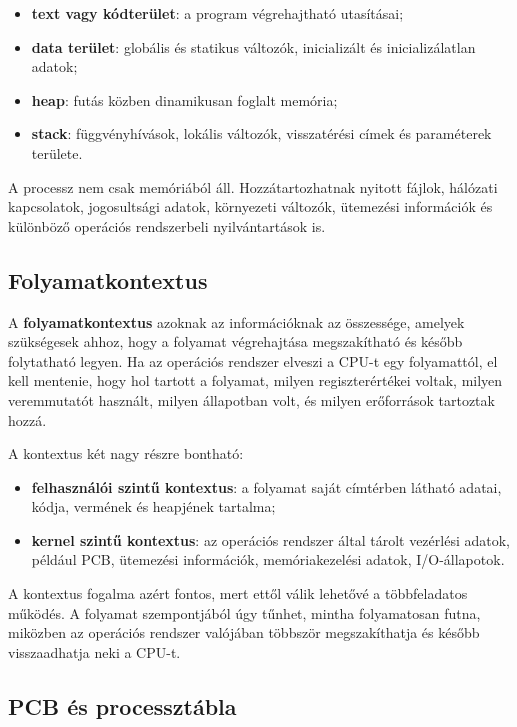 \begin{itemize}
  \item \textbf{text vagy kódterület}: a program végrehajtható utasításai;
  \item \textbf{data terület}: globális és statikus változók, inicializált és inicializálatlan adatok;
  \item \textbf{heap}: futás közben dinamikusan foglalt memória;
  \item \textbf{stack}: függvényhívások, lokális változók, visszatérési címek és paraméterek területe.
\end{itemize}

A processz nem csak memóriából áll. Hozzátartozhatnak nyitott fájlok, hálózati kapcsolatok, jogosultsági adatok, környezeti változók, ütemezési információk és különböző operációs rendszerbeli nyilvántartások is.

\subsection{Folyamatkontextus}

A \textbf{folyamatkontextus} azoknak az információknak az összessége, amelyek szükségesek ahhoz, hogy a folyamat végrehajtása megszakítható és később folytatható legyen. Ha az operációs rendszer elveszi a CPU-t egy folyamattól, el kell mentenie, hogy hol tartott a folyamat, milyen regiszterértékei voltak, milyen veremmutatót használt, milyen állapotban volt, és milyen erőforrások tartoztak hozzá.

A kontextus két nagy részre bontható:

\begin{itemize}
  \item \textbf{felhasználói szintű kontextus}: a folyamat saját címtérben látható adatai, kódja, vermének és heapjének tartalma;
  \item \textbf{kernel szintű kontextus}: az operációs rendszer által tárolt vezérlési adatok, például PCB, ütemezési információk, memóriakezelési adatok, I/O-állapotok.
\end{itemize}

A kontextus fogalma azért fontos, mert ettől válik lehetővé a többfeladatos működés. A folyamat szempontjából úgy tűnhet, mintha folyamatosan futna, miközben az operációs rendszer valójában többször megszakíthatja és később visszaadhatja neki a CPU-t.

\subsection{PCB és processztábla}

